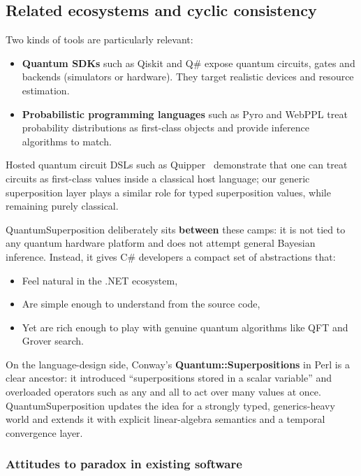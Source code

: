 \documentclass[a4paper,11pt]{article}
\begin{document}
\subsection{Related ecosystems and cyclic consistency}

Two kinds of tools are particularly relevant:

\begin{itemize}
\item
  	\textbf{Quantum SDKs} such as Qiskit and Q\# expose quantum circuits, gates and backends (simulators or hardware). They target realistic devices and resource estimation.\parencite{pyp25,Heim18QSharp}
\item
  	\textbf{Probabilistic programming languages} such as Pyro and WebPPL treat probability distributions as first-class objects and provide inference algorithms to match.\parencite{Goo19,Goodman14WebPPL}
\end{itemize}

Hosted quantum circuit DSLs such as Quipper~\parencite{Green13Quipper} demonstrate that one can treat circuits as first-class values inside a classical host language; our generic superposition layer plays a similar role for typed superposition values, while remaining purely classical.

QuantumSuperposition deliberately sits \textbf{between} these camps: it is not tied to any quantum hardware platform and does not attempt general Bayesian inference. Instead, it gives C\# developers a compact set of abstractions that:

\begin{itemize}
\item
  Feel natural in the .NET ecosystem,
\item
  Are simple enough to understand from the source code,
\item
  Yet are rich enough to play with genuine quantum algorithms like QFT and Grover search.
\end{itemize}

On the language-design side, Conway's \textbf{Quantum::Superpositions} in Perl is a clear ancestor: it introduced ``superpositions stored in a scalar variable'' and overloaded operators such as any and all to act over many values at once.\parencite{Dam25} QuantumSuperposition updates the idea for a strongly typed, generics-heavy world and extends it with explicit linear-algebra semantics and a temporal convergence layer.

\subsubsection{Attitudes to paradox in existing software}
\end{document}
